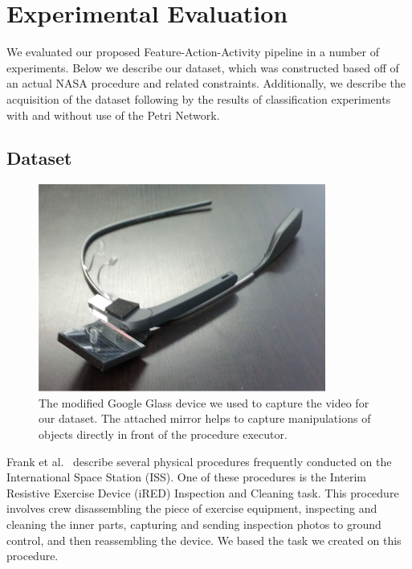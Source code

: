 \documentclass[10pt,twocolumn,letterpaper]{article}
\begin{document}
\section{Experimental Evaluation}

We evaluated our proposed Feature-Action-Activity pipeline in a number of experiments. Below we describe our dataset, which was constructed based off of an actual NASA procedure and related constraints. Additionally, we describe the acquisition of the dataset following by the results of classification experiments with and without use of the Petri Network.

\subsection{Dataset}

\begin{figure}[!b]
    \centering
    \includegraphics[width=\columnwidth]{fig/glass.png}
    \caption{The modified Google Glass device we used to capture the video for our dataset. The attached mirror helps to capture manipulations of objects directly in front of the procedure executor.}
    \label{fig:glass}
\end{figure}

Frank et al.~\cite{frank2013autonomous} describe several physical procedures frequently conducted on the International Space Station (ISS). One of these procedures is the Interim Resistive Exercise Device (iRED) Inspection and Cleaning task. This procedure involves crew disassembling the piece of exercise equipment, inspecting and cleaning the inner parts, capturing and sending inspection photos to ground control, and then reassembling the device. We based the task we created on this procedure.
\end{document}
